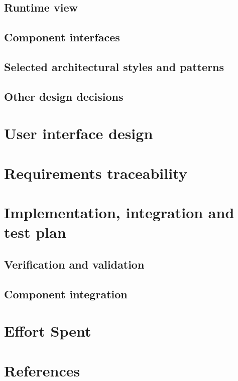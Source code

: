   \section{Runtime view}
  
  \section{Component interfaces}
  
  \section{Selected architectural styles and patterns}
  
  \section{Other design decisions}
  
  
  \chapter{User interface design}
  
  
  \chapter{Requirements traceability}
  
  
  \chapter{Implementation, integration and test plan}
  
  \section{Verification and validation}
  
  \section{Component integration}
  
  
  \chapter{Effort Spent}
  
  

  \chapter{References}
  
  
  

  \setupspellchecking[state=start]
